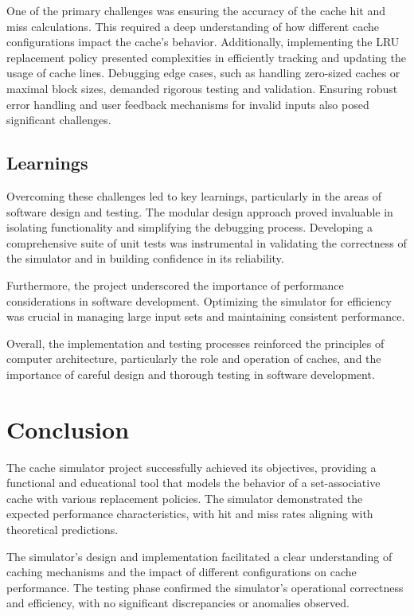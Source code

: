 \documentclass[12pt]{article}
\begin{document}
One of the primary challenges was ensuring the accuracy of the cache hit and miss calculations. This required a deep understanding of how different cache configurations impact the cache's behavior. Additionally, implementing the LRU replacement policy presented complexities in efficiently tracking and updating the usage of cache lines.
\newpage
\vspace*{1cm}
Debugging edge cases, such as handling zero-sized caches or maximal block sizes, demanded rigorous testing and validation. Ensuring robust error handling and user feedback mechanisms for invalid inputs also posed significant challenges.

\subsection{Learnings}

Overcoming these challenges led to key learnings, particularly in the areas of software design and testing. The modular design approach proved invaluable in isolating functionality and simplifying the debugging process. Developing a comprehensive suite of unit tests was instrumental in validating the correctness of the simulator and in building confidence in its reliability.

Furthermore, the project underscored the importance of performance considerations in software development. Optimizing the simulator for efficiency was crucial in managing large input sets and maintaining consistent performance.

Overall, the implementation and testing processes reinforced the principles of computer architecture, particularly the role and operation of caches, and the importance of careful design and thorough testing in software development.

\section{Conclusion}

The cache simulator project successfully achieved its objectives, providing a functional and educational tool that models the behavior of a set-associative cache with various replacement policies. The simulator demonstrated the expected performance characteristics, with hit and miss rates aligning with theoretical predictions.

The simulator's design and implementation facilitated a clear understanding of caching mechanisms and the impact of different configurations on cache performance. The testing phase confirmed the simulator's operational correctness and efficiency, with no significant discrepancies or anomalies observed.
\end{document}
